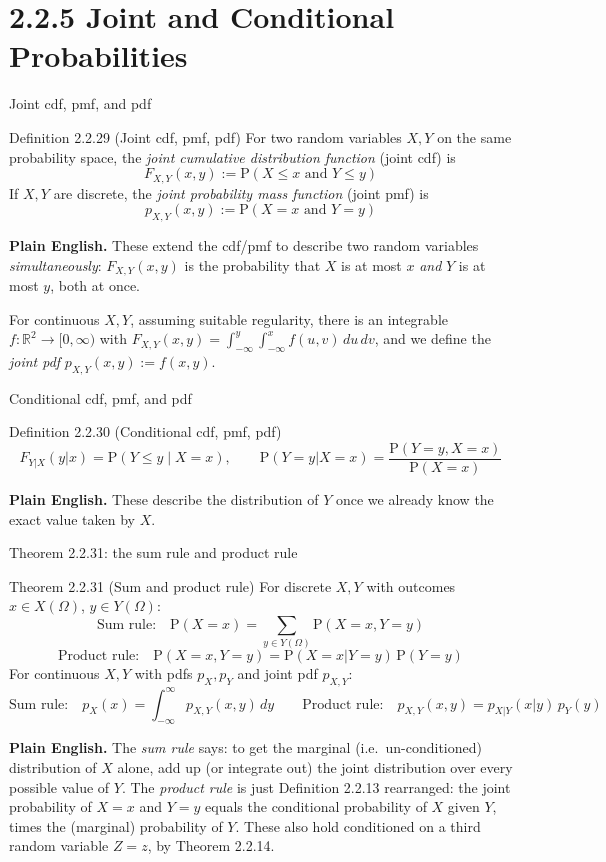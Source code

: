 \documentclass[aspectratio=169,10pt]{beamer}
\begin{document}
\section{2.2.5 Joint and Conditional Probabilities}

\begin{frame}{Joint cdf, pmf, and pdf}
\begin{block}{Definition 2.2.29 (Joint cdf, pmf, pdf)}
For two random variables $X,Y$ on the same probability space, the
\emph{joint cumulative distribution function} (joint cdf) is
\[ F_{X,Y}(x,y) := \mathrm{P}(X\leq x \text{ and } Y\leq y) \]
If $X,Y$ are discrete, the \emph{joint probability mass function} (joint pmf) is
\[ p_{X,Y}(x,y) := \mathrm{P}(X=x \text{ and } Y=y) \]
\end{block}
\textbf{Plain English.} These extend the cdf/pmf to describe two random
variables \emph{simultaneously}: $F_{X,Y}(x,y)$ is the probability that $X$
is at most $x$ \emph{and} $Y$ is at most $y$, both at once.

For continuous $X,Y$, assuming suitable regularity, there is an integrable
$f:\mathbb{R}^2\to[0,\infty)$ with
$F_{X,Y}(x,y)=\int_{-\infty}^{y}\int_{-\infty}^{x}f(u,v)\,du\,dv$, and we
define the \emph{joint pdf} $p_{X,Y}(x,y):=f(x,y)$.
\end{frame}

\begin{frame}{Conditional cdf, pmf, and pdf}
\begin{block}{Definition 2.2.30 (Conditional cdf, pmf, pdf)}
\[ F_{Y|X}(y|x) = \mathrm{P}(Y\leq y \mid X=x), \qquad
\mathrm{P}(Y=y|X=x) = \frac{\mathrm{P}(Y=y,X=x)}{\mathrm{P}(X=x)} \]
\end{block}
\textbf{Plain English.} These describe the distribution of $Y$ once we
already know the exact value taken by $X$.
\end{frame}

\begin{frame}{Theorem 2.2.31: the sum rule and product rule}
\begin{block}{Theorem 2.2.31 (Sum and product rule)}
For discrete $X,Y$ with outcomes $x\in X(\Omega)$, $y\in Y(\Omega)$:
\[ \text{Sum rule:} \quad \mathrm{P}(X=x) = \sum_{y\in Y(\Omega)}\mathrm{P}(X=x,Y=y) \]
\[ \text{Product rule:} \quad \mathrm{P}(X=x,Y=y) = \mathrm{P}(X=x|Y=y)\,\mathrm{P}(Y=y) \]
For continuous $X,Y$ with pdfs $p_X,p_Y$ and joint pdf $p_{X,Y}$:
\[ \text{Sum rule:} \quad p_X(x) = \int_{-\infty}^{\infty}p_{X,Y}(x,y)\,dy
\qquad
\text{Product rule:} \quad p_{X,Y}(x,y) = p_{X|Y}(x|y)\,p_Y(y) \]
\end{block}
\textbf{Plain English.} The \emph{sum rule} says: to get the marginal (i.e.\
un-conditioned) distribution of $X$ alone, add up (or integrate out) the
joint distribution over every possible value of $Y$. The \emph{product rule}
is just Definition 2.2.13 rearranged: the joint probability of $X=x$ and
$Y=y$ equals the conditional probability of $X$ given $Y$, times the
(marginal) probability of $Y$. These also hold conditioned on a third random
variable $Z=z$, by Theorem 2.2.14.
\end{frame}
\end{document}
